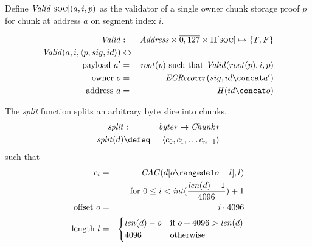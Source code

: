 \begin{definition}
\label{def:socproof-validity}
Define $\mathit{Valid}[\textsc{\lowercase{SOC}}](a, i, p)$ as the validator of a single owner chunk storage proof $p$ for chunk at address $a$ on segment index $i$.

\begin{eqnarray}
\mathit{Valid}&:&\mathit{Address}\times\overline{0,127}\times\Pi[\textsc{\lowercase{SOC}}]\mapsto\{T,F\}\\ \mathit{Valid}(a, i, \langle p, sig, id\rangle)&
\Leftrightarrow&\\
\text{payload } a'&=& \mathit{root}(p) \text{ such that } \mathit{Valid}(root(p),i,p)\\
\text{owner } o&=& \mathit{ECRecover}(sig,id\concat a')\\
\text{address } a&=& \mathit{H}(id\concat o)
\end{eqnarray}
\end{definition}

\begin{definition}
\label{def:chunking}
The \emph{split} function splits an arbitrary byte slice into chunks.
\begin{eqnarray}
\mathit{split}&:&\mathit{byte}{*}\mapsto\mathit{Chunk}{*}\\
\mathit{split}(d)&\defeq&\langle c_0, c_1, \ldots c_{n-1}\rangle\\
\end{eqnarray}
such that
\begin{eqnarray}
c_i&=&\mathit{CAC}(d[o\rangedel o+l],l)\\
&&\text{for }0\leq i<\mathit{int}( \frac{\mathit{len}(d)-1}{4096})+1
\\
\text{offset }o&=&i\cdot 4096\\
\text{length }l&=&\begin{cases}
\mathit{len}(d)-o&\text{if }o+4096>\mathit{len}(d)\\
4096&\text{otherwise}
\end{cases}
\end{eqnarray}
\end{definition}

